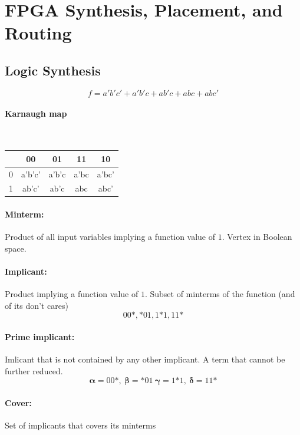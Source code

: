 \documentclass[a4paper]{article}
\begin{document}
\section{FPGA Synthesis, Placement, and Routing}

\subsection{Logic Synthesis}

$$f = a'b'c' + a'b'c + ab'c + abc + abc'$$

\paragraph{Karnaugh map}
\
\begin{table}[h!]
    \centering
    \begin{tabular}{c|c|c|c|c|}
         & 00 & 01 & 11 & 10\\\hline
        0 & a'b'c' & a'b'c & a'bc & a'bc'\\\hline
        1 & ab'c' & ab'c & abc & abc'\\\hline
    \end{tabular}
\end{table}

\paragraph{Minterm:} Product of all input variables implying a function value of $1$. Vertex in Boolean space.

\paragraph{Implicant:} Product implying a function value of $1$. Subset of minterms of the function (and of its don't cares)
$$00\mathord{*}, \mathord{*}01, 1\mathord{*}1, 11\mathord{*}$$

\paragraph{Prime implicant:} Imlicant that is not contained by any other implicant. A term that cannot be further reduced.
$$\mathbf{\alpha} = 00\mathord{*}, \ \mathbf{\beta} = \mathord{*}01 \ \mathbf{\gamma} = 1\mathord{*}1, \ \mathbf{\delta} = 11\mathord{*}$$

\paragraph{Cover:} Set of implicants that covers its minterms
\end{document}
